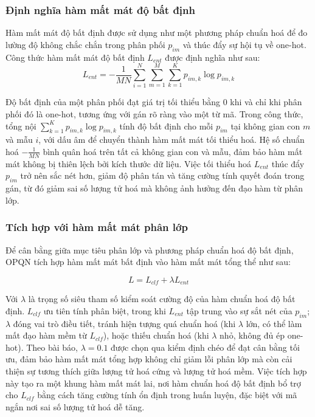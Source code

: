\subsubsection{ Định nghĩa hàm mất mát độ bất định}
Hàm mất mát độ bất định được sử dụng như một phương pháp chuẩn hoá để đo lường độ không chắc chắn trong phân phối $p_{im}$ và thúc đẩy sự hội tụ về one-hot. Công thức hàm mất mát độ bất định $L_{ent}$ được định nghĩa như sau:
\begin{equation}
    L_{ent} =  -\frac{1}{MN} \sum_{i=1}^N \sum_{m=1}^M \sum_{k=1}^K p_{im,k} \log p_{im,k}
\end{equation}

Độ bất định của một phân phối đạt giá trị tối thiểu bằng 0 khi và chỉ khi phân phối đó là one-hot, tương ứng với gán rõ ràng vào một từ mã. Trong công thức, tổng nội $\sum_{k=1}^K p_{im,k} \log p_{im,k}$ tính độ bất định cho mỗi $p_{im}$ tại không gian con $m$ và mẫu $i$, với dấu âm để chuyển thành hàm mất mát tối thiểu hoá. Hệ số chuẩn hoá $ -\frac{1}{MN}$ bình quân hoá trên tất cả không gian con và mẫu, đảm bảo hàm mất mát không bị thiên lệch bởi kích thước dữ liệu. Việc tối thiểu hoá $L_{ent}$ thúc đẩy $p_{im}$ trở nên sắc nét hơn, giảm độ phân tán và tăng cường tính quyết đoán trong gán, từ đó giảm sai số lượng tử hoá mà không ảnh hưởng đến đạo hàm từ phân lớp.

\subsubsection{ Tích hợp với hàm mất mát phân lớp}
Để cân bằng giữa mục tiêu phân lớp và phương pháp chuẩn hoá độ bất định, OPQN tích hợp hàm mất mát bất định vào hàm mất mát tổng thể như sau:

\begin{equation}
    L = L_{clf} + \lambda L_{ent}
\end{equation}

Với $\lambda$ là trọng số siêu tham số kiểm soát cường độ của hàm chuẩn hoá độ bất định. $L_{clf}$ ưu tiên tính phân biệt, trong khi $L_{ent}$ tập trung vào sự sắt nét của $p_{im}$; $\lambda$ đóng vai trò điều tiết, tránh hiện tượng quá chuẩn hoá (khi $\lambda$ lớn, có thể làm mất đạo hàm mềm từ $L_{clf}$), hoặc thiếu chuẩn hoá (khi $\lambda$ nhỏ, không đủ ép one-hot). Theo bài báo, $\lambda = 0.1$ được chọn qua kiểm định chéo để đạt cân bằng tối ưu, đảm bảo hàm mất mát tổng hợp không chỉ giảm lỗi phân lớp mà còn cải thiện sự tương thích giữa lượng tử hoá cứng và lượng tử hoá mềm. Việc tích hợp này tạo ra một khung hàm mất mát lai, nơi hàm chuẩn hoá độ bất định bổ trợ cho $L_{clf}$ bằng cách tăng cường tính ổn định trong huấn luyện, đặc biệt với mã ngắn nơi sai số lượng tử hoá dễ tăng.

